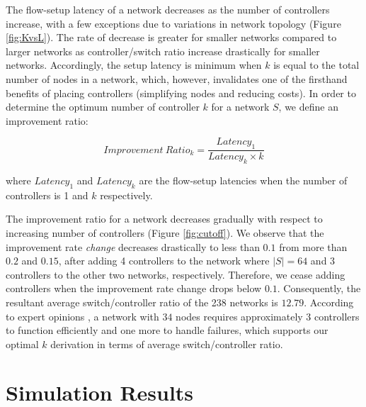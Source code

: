 \documentclass[final,5p,times]{cas-dc}
\begin{document}
	The flow-setup latency of a network decreases as the number of controllers increase, with a few exceptions due to variations in network topology (Figure \ref{fig:KvsL}). The rate of decrease is greater for smaller networks compared to larger networks as controller/switch ratio increase drastically for smaller networks. Accordingly, the setup latency is minimum when $k$ is equal to the total number of nodes in a network, which, however, invalidates one of the firsthand benefits of placing controllers (simplifying nodes and reducing costs). In order to determine the optimum number of controller $k$ for a network $S$, we define an improvement ratio:
	
	\begin{equation}
	Improvement~Ratio_k = \frac{Latency_1}{Latency_k\times k}
	\end{equation}
	
	where $Latency_1$ and $Latency_k$ are the flow-setup latencies when the number of controllers is 1 and $k$ respectively.
	
	The improvement ratio for a network decreases gradually with respect to increasing number of controllers (Figure \ref{fig:cutoff}). We observe that the improvement rate \textit{change} decreases drastically to less than $0.1$ from more than $0.2$ and $0.15$, after adding 4 controllers to the network where $|S|=64$ and 3 controllers to the other two networks, respectively. Therefore, we cease adding controllers when the improvement rate change drops below $0.1$. Consequently, the resultant average switch/controller ratio of the 238 networks is $12.79$. According to expert opinions \cite{heller2012latency}, a network with $34$ nodes requires approximately $3$ controllers to function efficiently and one more to handle failures, which supports our optimal $k$ derivation in terms of average switch/controller ratio.
	
	\section{Simulation Results} \label{simulationResults}
	
\end{document}
